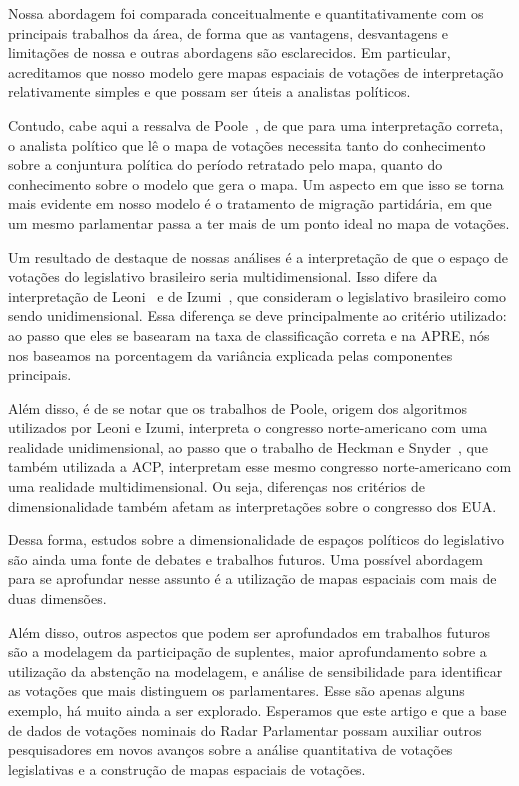 \documentclass[a4paper, 12pt]{article}
\begin{document}
Nossa abordagem foi comparada conceitualmente e quantitativamente com os principais trabalhos da área, de forma que as vantagens, desvantagens e limitações de nossa e outras abordagens são esclarecidos. Em particular, acreditamos que nosso modelo gere mapas espaciais de votações de interpretação relativamente simples e que possam ser úteis a analistas políticos.

Contudo, cabe aqui a ressalva de Poole~\cite{poole2005book}, de que para uma interpretação correta,  o analista político que lê o mapa de votações necessita tanto do conhecimento sobre a conjuntura política do período retratado pelo mapa, quanto do conhecimento sobre o modelo que gera o mapa. Um aspecto em que isso se torna mais evidente em nosso modelo é o tratamento de migração partidária, em que um mesmo parlamentar passa a ter mais de um ponto ideal no mapa de votações.

Um resultado de destaque de nossas análises é a interpretação de que o espaço de votações do legislativo brasileiro seria multidimensional. Isso difere da interpretação de Leoni~\cite{leoni02cdep} e de Izumi~\cite{izumi2016senado}, que consideram o legislativo brasileiro como sendo unidimensional. Essa diferença se deve principalmente ao critério utilizado: ao passo que eles se basearam na taxa de classificação correta e na APRE, nós nos baseamos na porcentagem da variância explicada pelas componentes principais. 

Além disso, é de se notar que os trabalhos de Poole, origem dos algoritmos utilizados por Leoni e Izumi, interpreta o congresso norte-americano com uma realidade unidimensional, ao passo que o trabalho de Heckman e Snyder~\cite{heckman-snyder1997}, que também utilizada a ACP, interpretam esse mesmo congresso norte-americano com uma realidade multidimensional. Ou seja, diferenças nos critérios de dimensionalidade também afetam as interpretações sobre o congresso dos EUA.

Dessa forma, estudos sobre a dimensionalidade de espaços políticos do legislativo são ainda uma fonte de debates e trabalhos futuros. Uma possível abordagem para se aprofundar nesse assunto é a utilização de mapas espaciais com mais de duas dimensões.

Além disso, outros aspectos que podem ser aprofundados em trabalhos futuros são a modelagem da participação de suplentes, maior aprofundamento sobre a utilização da abstenção na modelagem, e análise de sensibilidade para identificar as votações que mais distinguem os parlamentares. Esse são apenas alguns exemplo, há muito ainda a ser explorado. Esperamos que este artigo e que a base de dados de votações nominais do Radar Parlamentar possam auxiliar outros pesquisadores em novos avanços sobre a análise quantitativa de votações legislativas e a construção de mapas espaciais de votações.

{}

 
\end{document}
